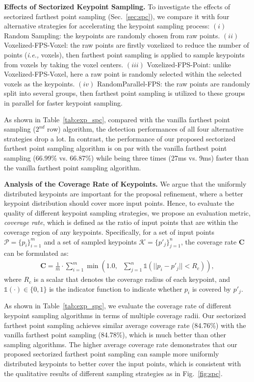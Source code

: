 \documentclass[natbib,twocolumn]{svjour3}          \smartqed  \usepackage{graphicx}
\begin{document}
\noindent
\textbf{Effects of Sectorized Keypoint Sampling.} 
To investigate the effects of sectorized farthest point sampling (Sec.~\ref{sec:spc}), 
we compare it with four alternative strategies for accelerating the keypoint sampling process: 
$(i)$ Random Sampling: the keypoints are randomly chosen from raw points. 
$(ii)$ Voxelized-FPS-Voxel: the raw points are firstly voxelized to reduce the number of points (\emph{i.e.,} voxels), then farthest point sampling is applied to sample keypoints from voxels by taking the voxel centers. 
$(iii)$ Voxelized-FPS-Point: unlike Voxelized-FPS-Voxel, here a raw point is randomly selected within the selected voxels as the keypoints.  
$(iv)$ RandomParallel-FPS: the raw points are randomly split into several groups, then farthest point sampling is utilized to these groups in parallel for faster keypoint sampling. 


As shown in Table~\ref{tab:exp_spc}, compared with the vanilla farthest point sampling ($2^{nd}$ row) algorithm, the detection performances of all four alternative strategies drop a lot. In contrast, the performance of our proposed sectorized farthest point sampling algorithm is on par with the vanilla farthest point sampling (66.99\% vs. 66.87\%) while being three times (27ms vs. 9ms) faster than the vanilla farthest point sampling algorithm. 


\noindent
\textbf{Analysis of the Coverage Rate of Keypoints.}
We argue that the uniformly distributed keypoints are important for the proposal refinement, where a better keypoint distribution should cover more input points. 
Hence, to evaluate the quality of different keypoint sampling strategies,
 we propose an evaluation metric, \textit{coverage rate}, 
which is defined as the ratio of input points that are within the coverage region of any keypoints. 
Specifically, for a set of input points $\mathcal{P}=\{p_i\}_{i=1}^m$ and a set of sampled keypoints $\mathcal{K}=\{p'_j\}_{j=1}^n$, the coverage rate $\mathbf{C}$ can be formulated as: 
\begin{align}\label{eq:coverage_rate}
	\mathbf{C} = \frac{1}{m}\cdot{\sum_{i=1}^{m} \min (1.0,~~~ \sum_{j=1}^{n}\mathds{1}({||p_i - p'_j|| < R_c}))},
\end{align}
where $R_c$ is a scalar that denotes the coverage radius of each keypoint, 
and $\mathds{1}\left(\cdot\right)\in\{0, 1\}$ is the indicator function to indicate whether $p_i$ is covered by $p'_j$.


As shown in Table~\ref{tab:exp_spc}, we evaluate the coverage rate of different keypoint sampling algorithms in terms of multiple coverage radii. Our sectorized farthest point sampling achieves similar average coverage rate (84.76\%) with the vanilla farthest point sampling (84.78\%), which is much better than other sampling algorithms.
The higher average coverage rate demonstrates that our proposed sectorized farthest point sampling can sample more uniformly distributed keypoints to better cover the input points, which is consistent with the qualitative results of different sampling strategies as in Fig.~\ref{fig:spc}. 
\end{document}
